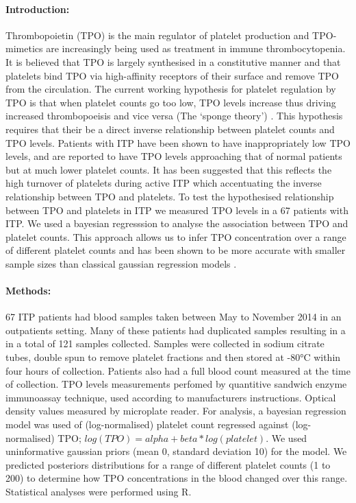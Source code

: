 \documentclass[11pt]{article}
\title{}
\author{George Adams .... Nichola Cooper}
\date{July 2018}
\begin{document}
\maketitle

\paragraph{Introduction:} Thrombopoietin (TPO) is the main regulator of platelet production and TPO-mimetics are increasingly being used as treatment in immune thrombocytopenia. It is believed that TPO is largely synthesised in a constitutive manner and that platelets bind TPO via high-affinity receptors of their surface and remove TPO from the circulation. The current working hypothesis for platelet regulation by TPO is that when platelet counts go too low, TPO levels increase thus driving increased thrombopoeisis and vice versa (The `sponge theory') \cite{Kaushanskymolecularmechanismsthat2005; EtoLinkagemechanismsthrombocytopenia2016}. This hypothesis requires that their be a direct inverse relationship between platelet counts and TPO levels. Patients with ITP have been shown to have inappropriately low TPO levels, and are reported to have TPO levels approaching that of normal patients but at much lower platelet counts. It has been suggested that this reflects the high turnover of platelets during active ITP which accentuating the inverse relationship between TPO and platelets. To test the hypothesised relationship between TPO and platelets in ITP we measured TPO levels in a 67 patients with ITP. We used a bayesian regresssion to analyse the association between TPO and platelet counts. This approach allows us to infer TPO concentration over a range of different platelet counts and has been shown to be more accurate with smaller sample sizes than classical gaussian regression models \cite{GoldsteinBayesiananalysisregression1976}.


\paragraph{Methods:} 67 ITP patients had blood samples taken between May to November 2014 in an outpatients setting. Many of these patients had duplicated samples resulting in a in a total of 121 samples collected. Samples were collected in sodium citrate tubes, double spun to remove platelet fractions and then stored at -80°C within four hours of collection. Patients also had a full blood count measured at the time of collection. TPO levels measurements perfomed by quantitive sandwich enzyme immunoassay technique, used according to manufacturers instructions. Optical density values measured by microplate reader. For analysis, a bayesian regression model was used of (log-normalised) platelet count regressed against (log-normalised) TPO; $log(TPO) = alpha + beta*log(platelet)$. We used uninformative gaussian priors (mean 0, standard deviation 10) for the model. We predicted posteriors distributions for a range of different platelet counts (1 to 200) to determine how TPO concentrations in the blood changed over this range. Statistical analyses were performed using R.
\end{document}
